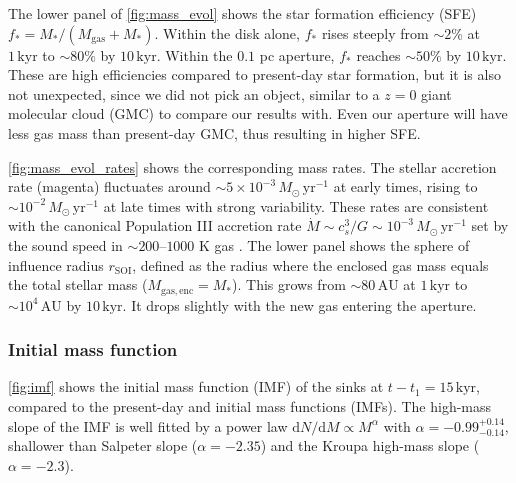 \documentclass[twocolumn]{openjournal}
\newcommand{\Msun}{M_\odot}
\newcommand{\kyr}{\,\mathrm{kyr}}
\newcommand{\AU}{\,\mathrm{AU}}
\newcommand{\tform}{t_1}
\begin{document}
The lower panel of \autoref{fig:mass_evol} shows the star
formation efficiency (SFE) $f_* = M_* / (M_\mathrm{gas} + M_*)$.
Within the disk alone, $f_*$ rises steeply from $\sim 2\%$ at
$1\kyr$ to $\sim 80\%$ by $10\kyr$.
Within the $0.1$ pc aperture, $f_*$ reaches $\sim 50\%$ by $10\kyr$.
These are high efficiencies compared to present-day star formation,
but it is also not unexpected, since we did not pick an object, similar to
a $z=0$ giant molecular cloud (GMC) to compare our results with.
Even our aperture will have less gas mass than present-day GMC,
thus resulting in higher SFE.


\autoref{fig:mass_evol_rates} shows the corresponding mass rates.
The stellar accretion rate (magenta) fluctuates around
$\sim 5 \times 10^{-3}\,\Msun\,\mathrm{yr}^{-1}$ at early times,
rising to $\sim 10^{-2}\,\Msun\,\mathrm{yr}^{-1}$ at late times
with strong variability.
These rates are consistent with the canonical Population III accretion
rate $\dot{M} \sim c_s^3/G \sim 10^{-3}\,\Msun\,\mathrm{yr}^{-1}$
set by the sound speed in $\sim 200$--$1000$ K gas
\citep{abel02, stacy10}.
The lower panel shows the sphere of influence radius
$r_\mathrm{SOI}$, defined as the radius where the enclosed
gas mass equals the total stellar mass
($M_\mathrm{gas,enc} = M_*$).
This grows from $\sim 80\AU$ at $1\kyr$ to $\sim 10^4\AU$ by
$10\kyr$. It drops slightly with the new gas entering the aperture.


\subsubsection{Initial mass function}
\label{sec:imf}

\autoref{fig:imf} shows the initial mass function (IMF) of the
sinks at $t - \tform = 15\kyr$, compared to the
present-day \citet{kroupa01} and \citet{chabrier03} initial mass
functions (IMFs).
The high-mass slope of the IMF is well fitted by a power law
$\mathrm{d}N/\mathrm{d}M \propto M^{\alpha}$ with $\alpha =
	-0.99^{+0.14}_{-0.14}$, shallower than Salpeter slope ($\alpha = -2.35$) and
the Kroupa high-mass slope ($\alpha = -2.3$).

\end{document}

